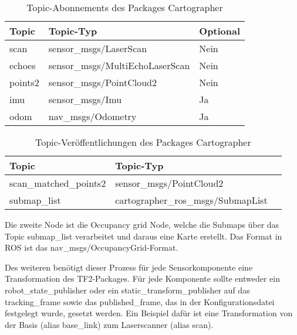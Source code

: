 \begin{table}[t]
  \caption{Topic-Abonnements des Packages Cartographer}
  \label{Cartographer-Topic-Abonnements}
  \centering
  \sffamily
  \begin{footnotesize}
    \begin{tabular}{l l l}
    \toprule
    \textbf{Topic} & \textbf{Topic-Typ} & \textbf{Optional}\\
    \midrule
    scan	& sensor\_msgs/LaserScan & Nein\\
    echoes	& sensor\_msgs/MultiEchoLaserScan & Nein\\
    points2	& sensor\_msgs/PointCloud2 & Nein\\
    imu	& sensor\_msgs/Imu & Ja\\
    odom	& nav\_msgs/Odometry & Ja\\
    \bottomrule
    \end{tabular}
  \end{footnotesize}
  \rmfamily
\end{table}

\begin{table}[t]
  \caption{Topic-Veröffentlichungen des Packages Cartographer}
  \label{Cartographer-Topic-Veröffentlichungen}
  \centering
  \sffamily
  \begin{footnotesize}
    \begin{tabular}{l l l}
    \toprule
    \textbf{Topic} & \textbf{Topic-Typ}\\
    \midrule
    scan\_matched\_points2 & sensor\_msgs/PointCloud2\\
    submap\_list & cartographer\_ros\_msgs/SubmapList\\
    \bottomrule
    \end{tabular}
  \end{footnotesize}
  \rmfamily
\end{table}

Die zweite Node ist die Occupancy grid Node, welche die Submaps über das Topic submap\_list verarbeitet und daraus eine Karte erstellt. Das Format in \ac{ROS} ist das nav\_msgs/OccupancyGrid-Format.

Des weiteren benötigt dieser Prozess für jede Sensorkomponente eine Transformation des TF2-Packages. Für jede Komponente sollte entweder ein robot\_state\_publisher oder ein static\_transform\_publisher auf das tracking\_frame sowie das published\_frame, das in der Konfigurationsdatei festgelegt wurde, gesetzt werden. Ein Beispiel dafür ist eine Transformation von der Basis (alias base\_link) zum Laserscanner (alias scan).

